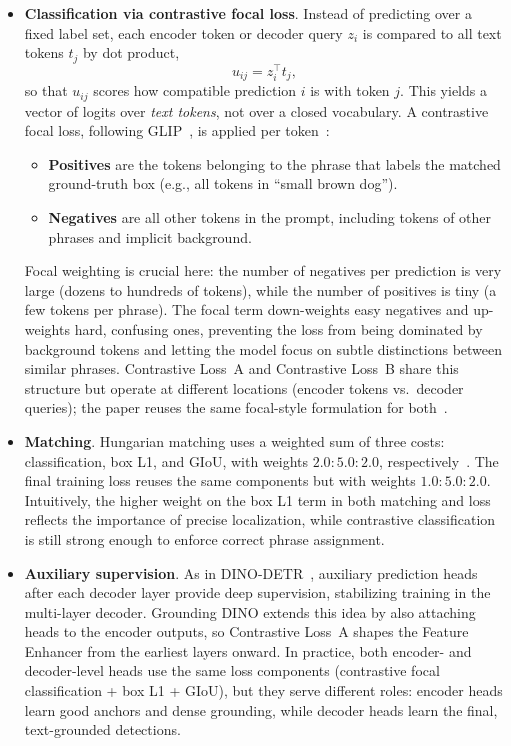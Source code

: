 \begin{enrichment}
\begin{enrichment}
\begin{itemize}
			\item \textbf{Classification via contrastive focal loss}.  
			Instead of predicting over a fixed label set, each encoder token or decoder query \(z_i\) is compared to all text tokens \(t_j\) by dot product,
			\[
			u_{ij} = z_i^\top t_j,
			\]
			so that \(u_{ij}\) scores how compatible prediction \(i\) is with token \(j\). This yields a vector of logits over \emph{text tokens}, not over a closed vocabulary. A contrastive focal loss, following GLIP~\cite{li2022_glip}, is applied per token~\cite{liu2023_groundingdino}:
			\begin{itemize}
				\item \textbf{Positives} are the tokens belonging to the phrase that labels the matched ground-truth box (e.g., all tokens in ``small brown dog'').
				\item \textbf{Negatives} are all other tokens in the prompt, including tokens of other phrases and implicit background.
			\end{itemize}
			Focal weighting is crucial here: the number of negatives per prediction is very large (dozens to hundreds of tokens), while the number of positives is tiny (a few tokens per phrase). The focal term down-weights easy negatives and up-weights hard, confusing ones, preventing the loss from being dominated by background tokens and letting the model focus on subtle distinctions between similar phrases. Contrastive Loss~A and Contrastive Loss~B share this structure but operate at different locations (encoder tokens vs.\ decoder queries); the paper reuses the same focal-style formulation for both~\cite{liu2023_groundingdino}.
			
			\item \textbf{Matching}.  
			Hungarian matching uses a weighted sum of three costs: classification, box L1, and GIoU, with weights \(2.0{:}5.0{:}2.0\), respectively~\cite{zhang2022_dino,liu2023_groundingdino}. The final training loss reuses the same components but with weights \(1.0{:}5.0{:}2.0\). Intuitively, the higher weight on the box L1 term in both matching and loss reflects the importance of precise localization, while contrastive classification is still strong enough to enforce correct phrase assignment.
			
			\item \textbf{Auxiliary supervision}.  
			As in DINO-DETR~\cite{zhang2022_dino}, auxiliary prediction heads after each decoder layer provide deep supervision, stabilizing training in the multi-layer decoder. Grounding DINO extends this idea by also attaching heads to the encoder outputs, so Contrastive Loss~A shapes the Feature Enhancer from the earliest layers onward. In practice, both encoder- and decoder-level heads use the same loss components (contrastive focal classification + box L1 + GIoU), but they serve different roles: encoder heads learn good anchors and dense grounding, while decoder heads learn the final, text-grounded detections.
		\end{itemize}
		

\end{enrichment}
\end{enrichment}
